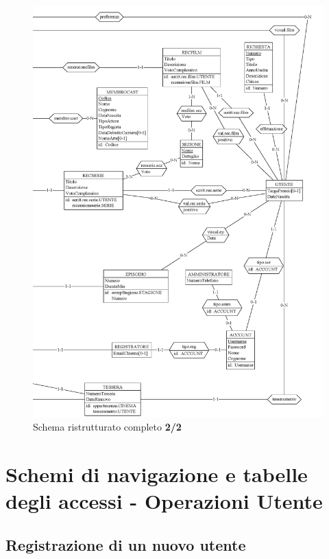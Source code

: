 \documentclass[a4paper,12pt]{report}
\begin{document}
	\begin{figure}[H]
		\centering
		\includegraphics[width=450pt]{ER/ristrutturazione/ristcomp2.png}
		\caption{Schema ristrutturato completo \textbf{2/2}}
	\end{figure}
	\section{Schemi di navigazione e tabelle degli accessi - Operazioni Utente}
	\subsection{Registrazione di un nuovo utente}
\end{document}
